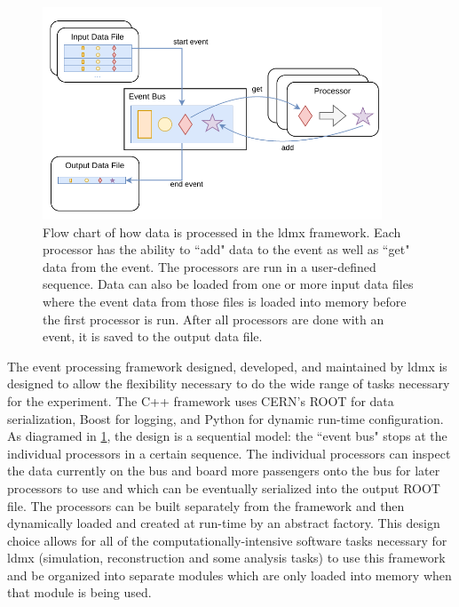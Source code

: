 \begin{figure}
  \centering
  \includegraphics[width=0.9\textwidth]{figures/ldmx/simulation/FrameworkFlowChart.drawio.pdf}
  \caption{Flow chart of how data is processed in the \ac{ldmx} framework. Each processor has the ability to ``add" data to the event as well as ``get" data from the event. The processors are run in a user-defined sequence. Data can also be loaded from one or more input data files where the event data from those files is loaded into memory before the first processor is run. After all processors are done with an event, it is saved to the output data file.}
  \label{fig:ldmx:sim:data-flow}
\end{figure}

The event processing framework designed, developed, and maintained by \ac{ldmx} is designed to
allow the flexibility necessary to do the wide range of tasks necessary for the experiment. The C++
framework uses CERN's ROOT \cite{cernroot} for data serialization, Boost  for logging, and Python \cite{python} for dynamic run-time
configuration. As diagramed in \cref{fig:ldmx:sim:data-flow}, the design is a sequential model: the
``event bus" stops at the individual processors in a certain sequence. The individual processors
can inspect the data currently on the bus and board more passengers onto the bus for later
processors to use and which can be eventually serialized into the output ROOT file. The processors can
be built separately from the framework and then dynamically loaded and created at run-time by an
abstract factory. This design choice allows for all of the computationally-intensive software tasks
necessary for \ac{ldmx} (simulation, reconstruction and some analysis tasks) to use this framework
and be organized into separate modules which are only loaded into memory when that module is being
used.

